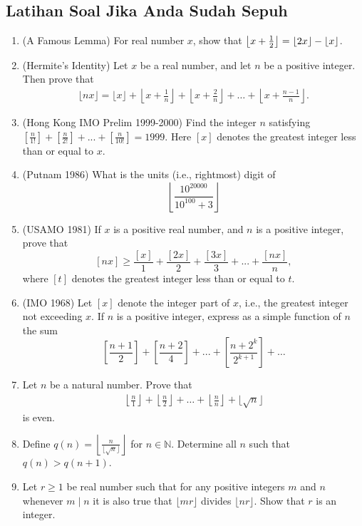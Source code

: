 \documentclass[12pt]{scrartcl}
\begin{document}
\subsection{Latihan Soal Jika Anda Sudah Sepuh}
\begin{enumerate}
    \item (A Famous Lemma) For real number $x$, show that $\left\lfloor x+\frac{1}{2} \right\rfloor = \left\lfloor 2x \right\rfloor-\left\lfloor x \right\rfloor$.

    \item (Hermite's Identity) Let $x$ be a real number, and let $n$ be a positive integer. Then prove that
    \begin{align*}
         \lfloor nx \rfloor = \lfloor x \rfloor + \left\lfloor x+\frac{1}{n} \right\rfloor + \left\lfloor x+\frac{2}{n} \right\rfloor + \dots + \left\lfloor x+\frac{n-1}{n} \right\rfloor.
    \end{align*}
    

    \item (Hong Kong IMO Prelim 1999-2000) Find the integer $n$ satisfying $\left[\frac{n}{1!}\right]+\left[\frac{n}{2!}\right]+...+\left[\frac{n}{10!}\right]=1999$. Here $[x]$ denotes the greatest integer less than or equal to $x$.

    \item (Putnam 1986) What is the units (i.e., rightmost) digit of
\[\left\lfloor \frac{10^{20000}}{10^{100}+3}\right\rfloor\]

    \item  (USAMO 1981) If $x$ is a positive real number, and $n$ is a positive integer, prove that
\[[nx] \geq \frac{[x]}{1} + \frac{[2x]}{2} + \frac{[3x]}{3} + ... + \frac{[nx]}{n},\]where $[t]$ denotes the greatest integer less than or equal to $t$.

    \item (IMO 1968) Let $[x]$ denote the integer part of $x$, i.e., the greatest integer not exceeding $x$. If $n$ is a positive integer, express as a simple function of $n$ the sum\[\left[\frac{n+1}{2}\right]+\left[\frac{n+2}{4}\right]+...+\left[\frac{n+2^k}{2^{k+1}}\right]+\ldots\]

    \item Let $n$ be a natural number. Prove that
    \begin{align*}
        \left\lfloor \frac{n}{1} \right\rfloor + \left\lfloor \frac{n}{2} \right\rfloor + \dots + \left\lfloor \frac{n}{n} \right\rfloor + \lfloor \sqrt{n} \rfloor
    \end{align*}
    is even.

    \item Define $q(n)=\left\lfloor\frac{n}{\lfloor\sqrt{n}\rfloor}\right\rfloor$ for $n \in \mathbb{N}$. Determine all $n$ such that $q(n)>q(n+1)$.

    \item Let $r \ge 1$ be real number such that for any positive integers $m$ and $n$ whenever $m \mid n$ it is also true that $\lfloor mr \rfloor$ divides $\lfloor nr \rfloor$. Show that $r$ is an integer.
\end{enumerate}
\end{document}
